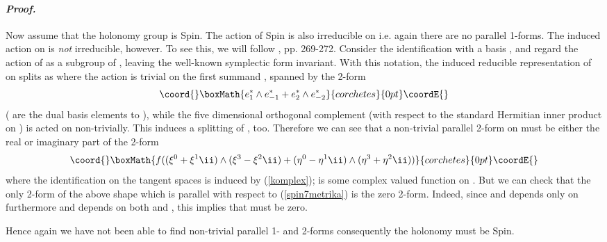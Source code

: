 \documentclass[a4paper,12pt,draft]{article}
\newenvironment{proof}{\paragraph{\it Proof.}}{\myHighlight{$\square$}\coordHE{}\vskip0.4cm}
\begin{document}
\begin{proof}
Now assume that the holonomy group is Spin\coordHE{}. The action of
Spin\coordHE{} is also irreducible on \coordHE{} i.e. again
there are no parallel 1-forms. The induced action
on \coordHE{} is {\it not} irreducible, however. To see this,
we will follow \cite{bro-tom}, pp. 269-272. Consider the identification 
\coordHE{} with a basis \coordHE{}, and regard the
action of \coordHE{} as a subgroup of \coordHE{}, leaving the well-known   
symplectic form invariant. With this notation, the induced
reducible representation of \coordHE{} on \coordHE{} splits as
\coordHE{}
where the action is trivial on the first summand \coordHE{}, spanned by
the 2-form
\[\coord{}\boxMath{e^*_1\wedge e^*_{-1}+e^*_2\wedge e^*_{-2}}{corchetes}{0pt}\coordE{}\]
(\coordHE{} are the dual basis elements to \coordHE{}), while the five
dimensional orthogonal complement \coordHE{} (with respect to
the standard Hermitian inner product on \coordHE{}) is acted on
non-trivially. This induces a splitting of \coordHE{}, too. Therefore
we can see that a non-trivial parallel 2-form on \coordHE{}
must be either the real or imaginary part of the 2-form 
\[\coord{}\boxMath{f((\xi^0+\xi^1\ii
)\wedge (\xi^3-\xi^2\ii )+(\eta^0-\eta^1\ii )\wedge
(\eta^3+\eta^2\ii ))}{corchetes}{0pt}\coordE{}\]
where the identification \coordHE{} on the
tangent spaces is induced by (\ref{komplex}); \coordHE{} is some complex valued
function on \coordHE{}. But we can check that
the only 2-form of the above shape which is parallel with respect to
(\ref{spin7metrika}) is the zero  2-form. Indeed, since \coordHE{} and depends only on \coordHE{}
furthermore \coordHE{} and depends on both \coordHE{} 
and \myHighlight{$\qq$}\coordHE{}, this implies that \coordHE{} must be zero.

Hence again we have not been able to find non-trivial parallel 1- and
2-forms consequently the holonomy must be Spin\coordHE{}.
\end{proof}
\end{document}
